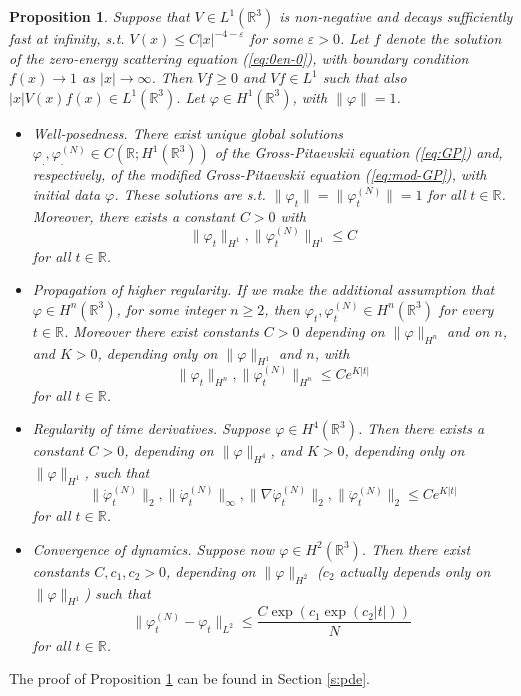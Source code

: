 \documentclass[11pt,a4paper,DIV11]{scrartcl}	%
\newtheorem{proposition}[thm]{Proposition}
\newcommand{\eps}{\varepsilon}
\newcommand{\bR}{{\mathbb R}}
\begin{document}
\begin{proposition} \label{t:pdes}
Suppose that $V \in L^1 (\bR^3)$ is non-negative and decays sufficiently fast at infinity, s.t. $V(x) \leq C |x|^{-4-\eps}$ for some $\eps > 0$. Let $f$ denote the solution of the zero-energy scattering equation (\ref{eq:0en-0}), with boundary condition $f(x) \to 1$ as $|x| \to \infty$. Then $Vf \geq 0$ and $Vf \in L^1$ such that also $|x| V(x) f(x) \in L^1 (\bR^3)$. Let $\varphi \in H^1 (\bR^3)$, with $\| \varphi \| = 1$.
\begin{itemize}
\item[(i)] Well-posedness. There exist unique global solutions $\varphi_. , \varphi_.^{(N)} \in C(\bR ; H^1 (\bR^3))$ of the Gross-Pitaevskii equation (\ref{eq:GP}) and, respectively, of the modified Gross-Pitaevskii equation (\ref{eq:mod-GP}), with initial data $\varphi$. These solutions are s.t. $\| \varphi_t \| = \| \varphi_t^{(N)} \| = 1$ for all $t \in \bR$. Moreover, there exists a constant $C > 0$ with 
\[  \| \varphi_t \|_{H^1} , \| \varphi_t^{(N)} \|_{H^1} \leq C \]
for all $t \in \bR$. 
\item[(ii)] Propagation of higher regularity. If we make the additional assumption that $\varphi \in H^n (\bR^3)$, for some integer $n \geq 2$, then $\varphi_t , \varphi_t^{(N)} \in H^n (\bR^3)$ for every $t \in \bR$. Moreover there exist constants $C>0$ depending on $\| \varphi \|_{H^n}$ and on $n$, and $K >0$, depending only on $\| \varphi \|_{H^1}$ and $n$, with
\begin{equation}\label{eq:hireg} \| \varphi_t \|_{H^n} , \| \varphi_t^{(N)} \|_{H^n} \leq C e^{K |t|} \end{equation}
for all $t \in \bR$. 
\item[(iii)] Regularity of time derivatives. Suppose $\varphi \in H^4 (\bR^3)$. Then there exists a constant $C>0$, depending on $\| \varphi \|_{H^4}$,  and $K > 0$, depending only on $\| \varphi \|_{H^1}$, such that
\[  \|\dot{\varphi}_t^{(N)} \|_2 , \| \dot{\varphi}_t^{(N)} \|_\infty , \| \nabla \dot{\varphi}_t^{(N)} \|_2 , \| \ddot{\varphi}_t^{(N)} \|_2 \leq C e^{K |t|} \]
for all $t \in \bR$.
\item[(iv)] Convergence of dynamics. Suppose now $\varphi \in H^2 (\bR^3)$. Then there exist constants $C,c_1,c_2 > 0$, depending on $\| \varphi \|_{H^2}$ ($c_2$ actually depends only on $\| \varphi \|_{H^1}$) such that 
\[ \| \varphi_t^{(N)} - \varphi_t \|_{L^2} \leq \frac{C \exp (c_1 \exp (c_2 |t|))}{N} \,  \]
for all $t \in \bR$.
\end{itemize}
\end{proposition} 
The proof of Proposition \ref{t:pdes} can be found in Section \ref{s:pde}. 
\end{document}
